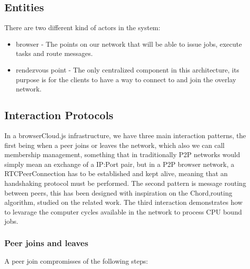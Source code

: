\subsection{Entities}

There are two different kind of actors in the system:

\begin{itemize}
    \item browser - The points on our network that will be able to issue jobs, execute tasks and route messages.
    \item rendezvous point - The only centralized component in this architecture, its purpose is for the clients to have a way to connect to and join the overlay network.
\end{itemize}

\subsection{Interaction Protocols}

In a browserCloud.js infrastructure, we have three main interaction patterns, the first being when a peer joins or leaves the network, which also we can call membership management, something that in traditionally P2P networks would simply mean an exchange of a IP:Port pair, but in a P2P browser network, a RTCPeerConnection has to be established and kept alive, meaning that an handshaking protocol must be performed. The second pattern is message routing between peers, this has been designed with inspiration on the Chord\cite{Stoica2001},routing algorithm, studied on the related work. The third interaction demonstrates how to levarage the computer cycles available in the network to process CPU bound jobs.

\subsubsection{Peer joins and leaves}

A peer join compromisses of the following steps:

